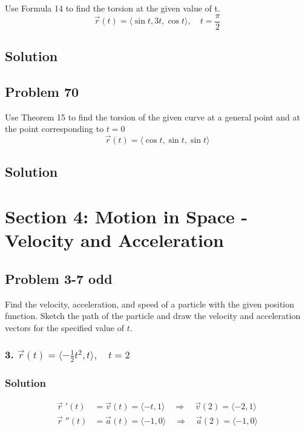 \documentclass{article}
\newcommand{\rvec}{\vec{r}(t)}
\newcommand{\drvec}{\vec{r}\;'(t)}
\begin{document}
Use Formula 14 to find the torsion at the given value of t.
\[
    \rvec = \langle{\sin{t}, 3t, \cos{t}}\rangle, \quad t = \frac{\pi}{2}
\]

\subsection*{Solution}
\subsection*{Problem 70}

Use Theorem 15 to find the torsion of the given curve at a general point and at the point corresponding to $t = 0$
\[
    \rvec = \langle{\cos{t}, \sin{t}, \sin{t}}\rangle
\]
\subsection*{Solution}

\section*{Section 4: Motion in Space - Velocity and Acceleration}
\subsection*{Problem 3-7 odd}

Find the velocity, acceleration, and speed of a particle with the given position function. Sketch the path of the particle and draw the velocity and acceleration vectors for the specified value of $t$.

\subsubsection*{3. $\rvec = \langle -\frac 1 2 t^2, t \rangle, \quad t = 2$}
\subsubsection*{Solution}
\begin{align*}
    \drvec &= \vec v (t) = \langle -t, 1 \rangle \quad \Rightarrow \quad \vec v (2) = \langle -2, 1 \rangle \\
    \vec r \;''(t) &= \vec a (t) = \langle -1, 0 \rangle \quad\Rightarrow \quad \vec a (2) = \langle -1, 0\rangle 
\end{align*}
\end{document}
